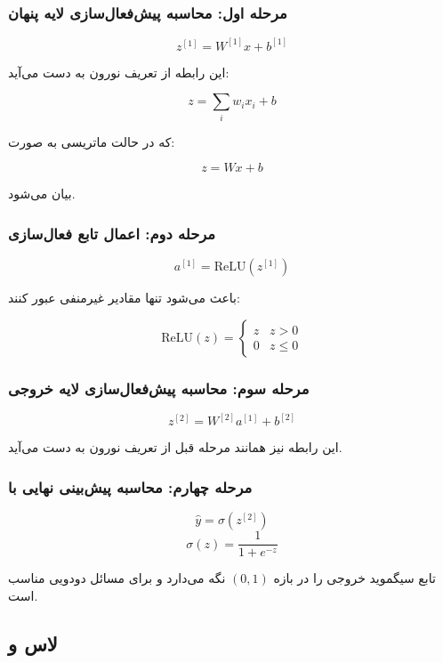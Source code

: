 \documentclass{article}
\begin{document}
\subsubsection*{مرحله اول: محاسبه پیش‌فعال‌سازی لایه پنهان}

\[
z^{[1]} = W^{[1]} x + b^{[1]}
\]

این رابطه از تعریف نورون به دست می‌آید:

\[
z = \sum_{i} w_i x_i + b
\]

که در حالت ماتریسی به صورت:

\[
z = W x + b
\]

بیان می‌شود.

\subsubsection*{مرحله دوم: اعمال تابع فعال‌سازی }

\[
a^{[1]} = \text{ReLU}(z^{[1]})
\]

 باعث می‌شود تنها مقادیر غیرمنفی عبور کنند:

\[
\text{ReLU}(z) =
\begin{cases}
	z & z > 0 \\
	0 & z \le 0
\end{cases}
\]

\subsubsection*{مرحله سوم: محاسبه پیش‌فعال‌سازی لایه خروجی}

\[
z^{[2]} = W^{[2]} a^{[1]} + b^{[2]}
\]

این رابطه نیز همانند مرحله قبل از تعریف نورون به دست می‌آید.

\subsubsection*{مرحله چهارم: محاسبه پیش‌بینی نهایی با }

\[
\hat{y} = \sigma(z^{[2]})
\]
\[
\sigma(z)=\frac{1}{1+e^{-z}}
\]

تابع سیگموید خروجی را در بازه \((0,1)\) نگه می‌دارد و برای مسائل دودویی مناسب است.




\subsection{لاس  و }
\end{document}

